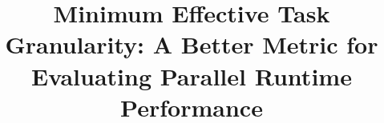 \documentclass[sigconf,review]{acmart}
\begin{document}
\title{Minimum Effective Task Granularity: A Better Metric for Evaluating Parallel Runtime Performance}


\begin{abstract}
\end{abstract}



\maketitle


\end{document}
